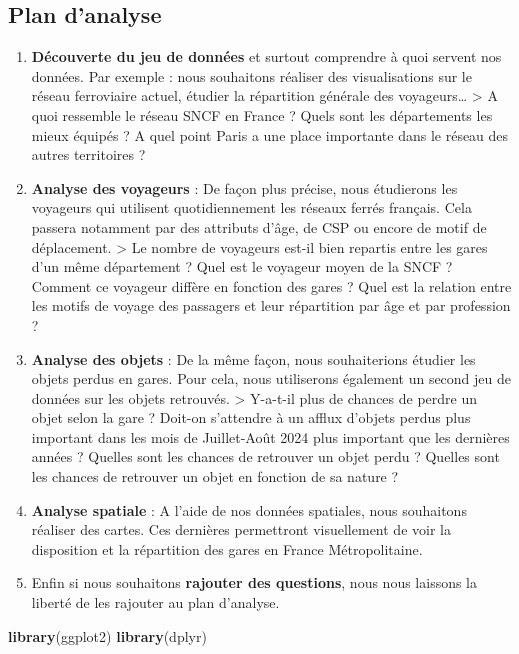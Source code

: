 \documentclass[
]{article}
\newenvironment{Shaded}{\begin{snugshade}}{\end{snugshade}}
\newcommand{\FunctionTok}[1]{\textcolor[rgb]{0.13,0.29,0.53}{\textbf{#1}}}
\newcommand{\NormalTok}[1]{#1}
\begin{document}
\hypertarget{plan-danalyse}{%
\subsection{Plan d'analyse}\label{plan-danalyse}}

\begin{enumerate}
\def\labelenumi{\arabic{enumi}.}
\item
  \textbf{Découverte du jeu de données} et surtout comprendre à quoi
  servent nos données. Par exemple : nous souhaitons réaliser des
  visualisations sur le réseau ferroviaire actuel, étudier la
  répartition générale des voyageurs\ldots{} \textgreater{} A quoi
  ressemble le réseau SNCF en France ? Quels sont les départements les
  mieux équipés ? A quel point Paris a une place importante dans le
  réseau des autres territoires ?
\item
  \textbf{Analyse des voyageurs} : De façon plus précise, nous
  étudierons les voyageurs qui utilisent quotidiennement les réseaux
  ferrés français. Cela passera notamment par des attributs d'âge, de
  CSP ou encore de motif de déplacement. \textgreater{} Le nombre de
  voyageurs est-il bien repartis entre les gares d'un même département ?
  Quel est le voyageur moyen de la SNCF ? Comment ce voyageur diffère en
  fonction des gares ? Quel est la relation entre les motifs de voyage
  des passagers et leur répartition par âge et par profession ?
\item
  \textbf{Analyse des objets} : De la même façon, nous souhaiterions
  étudier les objets perdus en gares. Pour cela, nous utiliserons
  également un second jeu de données sur les objets retrouvés.
  \textgreater{} Y-a-t-il plus de chances de perdre un objet selon la
  gare ? Doit-on s'attendre à un afflux d'objets perdus plus important
  dans les mois de Juillet-Août 2024 plus important que les dernières
  années ? Quelles sont les chances de retrouver un objet perdu ?
  Quelles sont les chances de retrouver un objet en fonction de sa
  nature ?
\item
  \textbf{Analyse spatiale} : A l'aide de nos données spatiales, nous
  souhaitons réaliser des cartes. Ces dernières permettront visuellement
  de voir la disposition et la répartition des gares en France
  Métropolitaine.
\item
  Enfin si nous souhaitons \textbf{rajouter des questions}, nous nous
  laissons la liberté de les rajouter au plan d'analyse.
\end{enumerate}

\begin{Shaded}
\begin{Highlighting}[]
\FunctionTok{library}\NormalTok{(ggplot2)}
\FunctionTok{library}\NormalTok{(dplyr)}
\end{Highlighting}
\end{Shaded}
\end{document}
